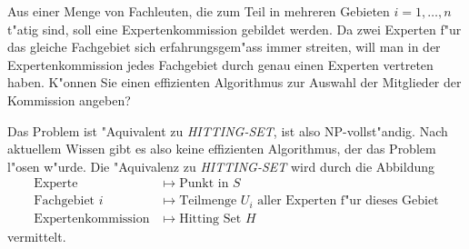 Aus einer Menge von Fachleuten, die zum Teil in mehreren Gebieten
$i=1,\dots,n$ t"atig sind, soll eine Expertenkommission gebildet werden.
Da zwei Experten f"ur das gleiche Fachgebiet sich erfahrungsgem"ass
immer streiten, will man in der Expertenkommission jedes Fachgebiet
durch genau einen Experten vertreten haben. K"onnen Sie einen effizienten
Algorithmus zur Auswahl der Mitglieder der Kommission angeben?

\begin{loesung}
Das Problem ist "Aquivalent zu \textsl{HITTING-SET}, ist also
NP-vollst"andig. Nach aktuellem Wissen gibt es also keine
effizienten Algorithmus, der das Problem l"osen w"urde. Die
"Aquivalenz zu \textsl{HITTING-SET} wird durch die Abbildung
\begin{align*}
\text{Experte}&\mapsto \text{Punkt in $S$}\\
\text{Fachgebiet $i$}&\mapsto \text{Teilmenge $U_i$ aller Experten f"ur dieses Gebiet}\\
\text{Expertenkommission}&\mapsto \text{Hitting Set $H$}
\end{align*}
vermittelt.
\end{loesung}
